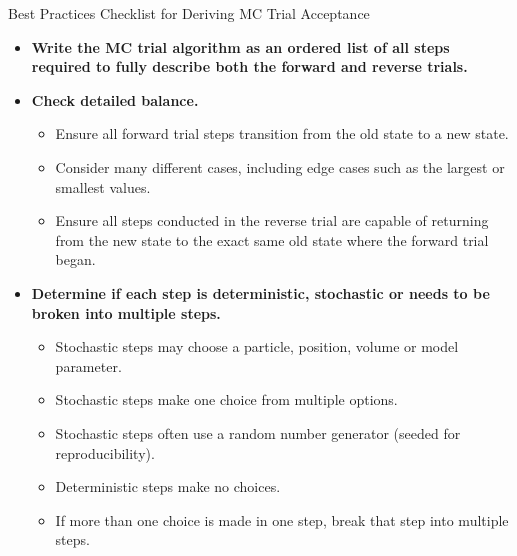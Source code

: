 \documentclass[
  9pt,
  bestpractices,
]{livecoms}
\begin{document}
\begin{Checklists*}[p!]
\begin{checklist}{Best Practices Checklist for Deriving MC Trial Acceptance}
\begin{itemize}
\item
  \textbf{Write the MC trial algorithm as an ordered list of all steps required to fully describe both the forward and reverse trials.}

\item
  \textbf{Check detailed balance.}
  \begin{itemize}
    \item Ensure all forward trial steps transition from the old state to a new state.
    \item Consider many different cases, including edge cases such as the largest or smallest values.
    \item Ensure all steps conducted in the reverse trial are capable of returning from the new state to the exact same old state where the forward trial began.
  \end{itemize}

\item
  \textbf{Determine if each step is deterministic, stochastic or needs to be broken into multiple steps.}
  \begin{itemize}
    \item Stochastic steps may choose a particle, position, volume or model parameter.
    \item Stochastic steps make one choice from multiple options.
    \item Stochastic steps often use a random number generator (seeded for reproducibility).
    \item Deterministic steps make no choices.
    \item If more than one choice is made in one step, break that step into multiple steps.
  \end{itemize}


\end{itemize}
\end{checklist}
\end{Checklists*}
\end{document}
